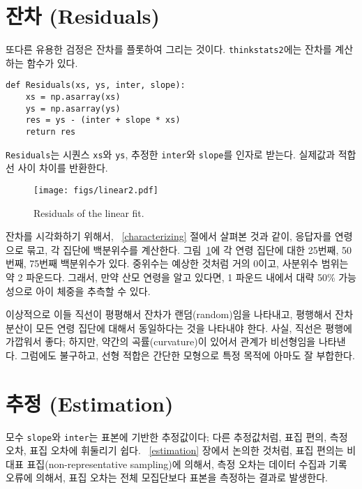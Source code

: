 \section{잔차 (Residuals)}
\label{residuals}

또다른 유용한 검정은 잔차를 플롯하여 그리는 것이다.
{\tt thinkstats2}에는 잔차를 계산하는 함수가 있다.

\begin{verbatim}
def Residuals(xs, ys, inter, slope):
    xs = np.asarray(xs)
    ys = np.asarray(ys)
    res = ys - (inter + slope * xs)
    return res
\end{verbatim}

{\tt Residuals}는 시퀀스 {\tt xs}와 {\tt ys}, 추정한 {\tt inter}와 {\tt slope}를 인자로 받는다. 실제값과 적합선 사이 차이를 반환한다.

\begin{figure}
\centerline{\texttt{[image: figs/linear2.pdf]}}
\caption{Residuals of the linear fit.}
\label{linear2}
\end{figure}

잔차를 시각화하기 위해서, ~\ref{characterizing} 절에서 살펴본 것과 같이, 응답자를 연령으로 묶고, 각 집단에 백분위수를 계산한다. 
그림~\ref{linear2}에 각 연령 집단에 대한 25번째, 50번째, 75번째 백분위수가 있다.
중위수는 예상한 것처럼 거의 0이고, 사분위수 범위는 약 2 파운드다. 그래서, 만약 산모 연령을 알고 있다면, 1 파운드 내에서 대략 50\% 가능성으로 아이 체중을 추측할 수 있다.

이상적으로 이들 직선이 평평해서 잔차가 랜덤(random)임을 나타내고, 
평행해서 잔차 분산이 모든 연령 집단에 대해서 동일하다는 것을 나타내야 한다.
사실, 직선은 평행에 가깝워서 좋다; 하지만, 약간의 곡률(curvature)이 있어서 관계가 비선형임을 나타낸다.
그럼에도 불구하고, 선형 적합은 간단한 모형으로 특정 목적에 아마도 잘 부합한다.  



\section{추정 (Estimation)}
\label{regest}

모수 {\tt slope}와 {\tt inter}는 표본에 기반한 추정값이다; 다른 추정값처럼, 표집 편의, 측정 오차, 표집 오차에 휘둘리기 쉽다. 
~\ref{estimation} 장에서 논의한 것처럼, 표집 편의는 비대표 표집(non-representative sampling)에 의해서, 측정 오차는 데이터 수집과 기록 오류에 의해서, 표집 오차는 전체 모집단보다 표본을 측정하는 결과로 발생한다.

